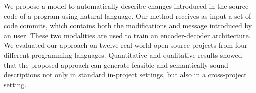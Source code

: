 We propose a model to automatically describe changes introduced in the source code of a program using natural language. Our method receives as input a set of code commits, which contains both the modifications and  message introduced by an user. These two modalities are used to train  an encoder-decoder architecture. We evaluated our approach on twelve real world open source projects from four different programming languages. Quantitative and qualitative results showed that the proposed approach can generate feasible and semantically sound descriptions not only in standard in-project settings, but also in a cross-project setting.
